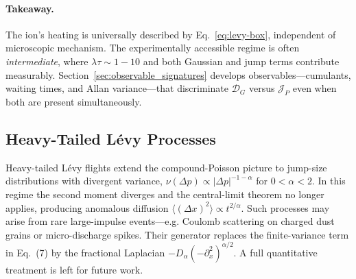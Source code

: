 \paragraph{Takeaway.}
The ion's heating is universally described by Eq.~\eqref{eq:levy-box}, independent of microscopic mechanism.
The experimentally accessible regime is often \emph{intermediate}, where $\lambda \tau \sim 1{-}10$ and both Gaussian and jump terms contribute measurably.
Section~\ref{sec:observable_signatures} develops observables—cumulants, waiting times, and Allan variance—that discriminate $\mathcal{D}_G$ versus $\mathcal{J}_P$ even when both are present simultaneously.

\subsection{Heavy-Tailed L\'evy Processes}
Heavy-tailed L\'evy flights extend the compound-Poisson picture to jump-size distributions with divergent variance,
$\nu(\Delta p)\!\propto\! |\Delta p|^{-1-\alpha}$ for $0<\alpha<2$.
In this regime the second moment diverges and the central-limit theorem no longer applies, producing anomalous diffusion $\langle (\Delta x)^2 \rangle \propto t^{2/\alpha}$.
Such processes may arise from rare large-impulse events—e.g. Coulomb scattering on charged dust grains or micro-discharge spikes.
Their generator replaces the finite-variance term in Eq.~(7) by the fractional Laplacian $-D_\alpha(-\partial_x^2)^{\alpha/2}$.
A full quantitative treatment is left for future work.
